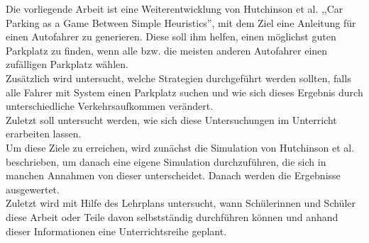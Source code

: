 Die vorliegende Arbeit ist eine Weiterentwicklung von Hutchinson et al. ,,Car Parking as a Game Between Simple Heuristics''\cite{hutchinson}, mit dem Ziel eine Anleitung für einen Autofahrer zu generieren. Diese soll ihm helfen, einen möglichst guten Parkplatz zu finden, wenn alle bzw. die meisten anderen Autofahrer einen zufälligen Parkplatz wählen.\\
Zusätzlich wird untersucht, welche Strategien durchgeführt werden sollten, falls alle Fahrer mit System einen Parkplatz suchen und wie sich dieses Ergebnis durch unterschiedliche Verkehrsaufkommen verändert.\\
 Zuletzt soll untersucht werden, wie sich diese Untersuchungen im Unterricht erarbeiten lassen.\\
  Um diese Ziele zu erreichen, wird zunächst die Simulation von Hutchinson et al. beschrieben, um danach eine eigene Simulation durchzuführen, die sich in manchen Annahmen von dieser unterscheidet. Danach werden die Ergebnisse ausgewertet.\\
  Zuletzt wird mit Hilfe des Lehrplans untersucht, wann Schülerinnen und Schüler diese Arbeit oder Teile davon selbstständig durchführen können und anhand dieser Informationen eine Unterrichtsreihe geplant.\\
  